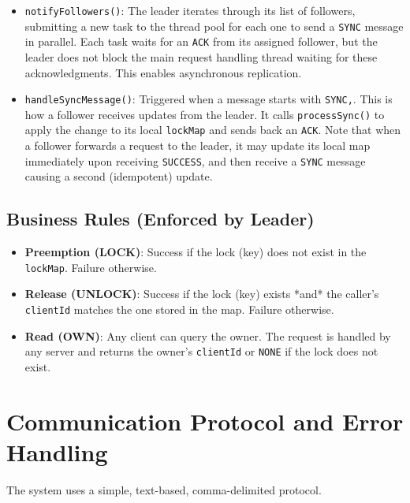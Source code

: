 \documentclass[a4paper,11pt]{article}
\begin{document}
\begin{itemize}
\begin{itemize}
\begin{itemize}
                \end{itemize}
            \item \texttt{notifyFollowers()}: The leader iterates through its list of followers, submitting a new task to the thread pool for each one to send a \texttt{SYNC} message in parallel. Each task waits for an \texttt{ACK} from its assigned follower, but the leader does not block the main request handling thread waiting for these acknowledgments. This enables asynchronous replication.
            \item \texttt{handleSyncMessage()}: Triggered when a message starts with \texttt{SYNC,}. This is how a follower receives updates from the leader. It calls \texttt{processSync()} to apply the change to its local \texttt{lockMap} and sends back an \texttt{ACK}. Note that when a follower forwards a request to the leader, it may update its local map immediately upon receiving \texttt{SUCCESS}, and then receive a \texttt{SYNC} message causing a second (idempotent) update.
        \end{itemize}
\end{itemize}

\subsection*{Business Rules (Enforced by Leader)}
\begin{itemize}
    \item \textbf{Preemption (LOCK)}: Success if the lock (key) does not exist in the \texttt{lockMap}. Failure otherwise.
    \item \textbf{Release (UNLOCK)}: Success if the lock (key) exists *and* the caller's \texttt{clientId} matches the one stored in the map. Failure otherwise.
    \item \textbf{Read (OWN)}: Any client can query the owner. The request is handled by any server and returns the owner's \texttt{clientId} or \texttt{NONE} if the lock does not exist.
\end{itemize}

\section{Communication Protocol and Error Handling}
The system uses a simple, text-based, comma-delimited protocol.
\end{document}
